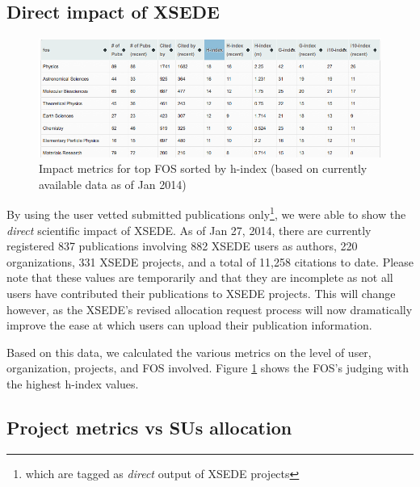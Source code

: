 \documentclass{sig-alternate}
\begin{document}
\subsection{Direct impact of XSEDE} 
 
\begin{figure}[!htb] 
  \centering 
    \includegraphics[width=2.0\columnwidth]{images/XDPUBS_Metrics_FOS.png} 
  \caption{Impact metrics for top FOS sorted by h-index (based on currently available data as of Jan 2014)}\label{F:xdpubs-metrics-fos} 
\end{figure} 
 
By using the user vetted submitted publications only\footnote{which are tagged as \emph{direct} output of XSEDE projects}, we were able to show the \emph{direct} scientific impact of XSEDE.  As of Jan 27, 2014, there are currently registered 837 publications involving 882 XSEDE users as authors, 220 organizations, 331 XSEDE projects, and a total of 11,258 citations to date. Please note that these values are temporarily and that they are incomplete as not all users have contributed their publications to XSEDE projects.   This will change however, as the XSEDE's revised allocation request process will now dramatically improve the ease at which users can upload their publication information.

Based on this data, we calculated the various metrics on the level of user, organization, projects, and FOS involved. Figure \ref{F:xdpubs-metrics-fos} shows the FOS's judging with the highest h-index values. 
 
\subsection{Project metrics vs SUs allocation} 
 
\end{document}
